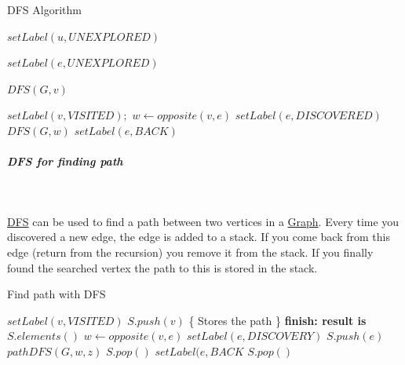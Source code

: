 \documentclass[11pt,twoside,twocolumn,landscape]{article}
\begin{document}
\begin{algorithm}
  \caption{DFS Algorithm}
  \begin{algorithmic}[1]
    \State $setLabel(u, UNEXPLORED)$
    \EndFor

    \State $setLabel(e, UNEXPLORED)$
    \EndFor

    \State $DFS(G, v)$
    \EndIf
    \EndFor
    \EndProcedure
  \end{algorithmic}
  \begin{algorithmic}[1]
    \State $setLabel(v, VISITED);$
    \State $w \leftarrow opposite(v,e)$
    \State $setLabel(e, DISCOVERED)$
    \State $DFS(G, w)$
    \Else
    \State $setLabel(e, BACK)$
    \EndIf
    \EndIf
    \EndFor
    \EndProcedure
  \end{algorithmic}
\end{algorithm}

\subparagraph{DFS for finding path} \
\label{sec:org7f2a2aa}

\href{../../../roam/20220202095038-dfs.org}{DFS} can be used to find a path between two vertices in a \href{../../../roam/20220201163000-graph.org}{Graph}.
Every time you discovered a new edge, the edge is added to a stack.
If you come back from this edge (return from the recursion) you remove it from the stack.
If you finally found the searched vertex the path to this is stored in the stack.




\begin{algorithm}
  \caption{Find path with DFS}
  \begin{algorithmic}[1]
    \State $setLabel(v, VISITED)$
    \State $S.push(v)$ \{ Stores the path \}
    \State \textbf{finish: result is} $S.elements()$
    \EndIf
    \State $w \leftarrow opposite(v, e)$
    \State $setLabel(e, DISCOVERY)$
    \State $S.push(e)$
    \State $pathDFS(G, w, z)$
    \State $S.pop()$
    \Else
    \State $setLabel(e, BACK$
    \EndIf
    \EndIf
    \EndFor
    \State $S.pop()$
    \EndProcedure
  \end{algorithmic}
\end{algorithm}
\end{document}
